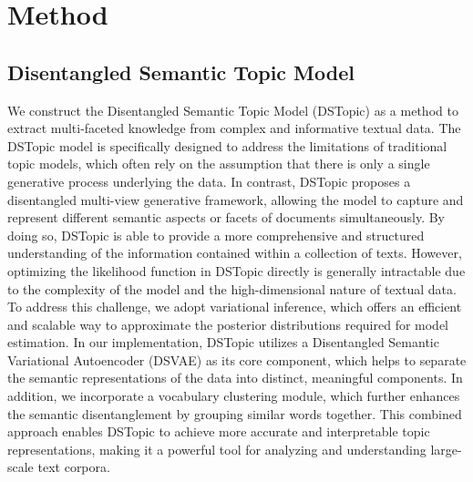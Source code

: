 
\chapter{Method} %

\label{ChapterX} %


\section{Disentangled Semantic Topic Model}

We construct the Disentangled Semantic Topic Model (DSTopic) as a method to extract multi-faceted knowledge from complex and informative textual data. The DSTopic model is specifically designed to address the limitations of traditional topic models, which often rely on the assumption that there is only a single generative process underlying the data. In contrast, DSTopic proposes a disentangled multi-view generative framework, allowing the model to capture and represent different semantic aspects or facets of documents simultaneously. By doing so, DSTopic is able to provide a more comprehensive and structured understanding of the information contained within a collection of texts. However, optimizing the likelihood function in DSTopic directly is generally intractable due to the complexity of the model and the high-dimensional nature of textual data. To address this challenge, we adopt variational inference, which offers an efficient and scalable way to approximate the posterior distributions required for model estimation. In our implementation, DSTopic utilizes a Disentangled Semantic Variational Autoencoder (DSVAE) as its core component, which helps to separate the semantic representations of the data into distinct, meaningful components. In addition, we incorporate a vocabulary clustering module, which further enhances the semantic disentanglement by grouping similar words together. This combined approach enables DSTopic to achieve more accurate and interpretable topic representations, making it a powerful tool for analyzing and understanding large-scale text corpora.


